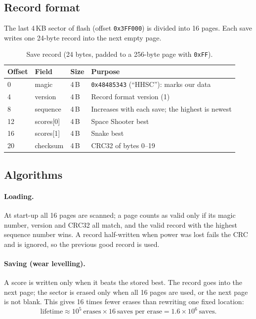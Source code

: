 \documentclass[11pt,a4paper]{article}
\begin{document}
\subsection{Record format}
The last 4\,KB sector of flash (offset \texttt{0x3FF000}) is divided into 16
pages. Each save writes one 24-byte record into the next empty page.

\begin{table}[H]
\centering
\caption{Save record (24 bytes, padded to a 256-byte page with \texttt{0xFF}).}
\begin{tabular}{llll}
\toprule
\textbf{Offset} & \textbf{Field} & \textbf{Size} & \textbf{Purpose} \\
\midrule
0 & magic & 4\,B & \texttt{0x48485343} (``HHSC''): marks our data \\
4 & version & 4\,B & Record format version (1) \\
8 & sequence & 4\,B & Increases with each save; the highest is newest \\
12 & scores[0] & 4\,B & Space Shooter best \\
16 & scores[1] & 4\,B & Snake best \\
20 & checksum & 4\,B & CRC32 of bytes 0--19 \\
\bottomrule
\end{tabular}
\end{table}

\subsection{Algorithms}
\paragraph{Loading.} At start-up all 16 pages are scanned; a page counts as
valid only if its magic number, version and CRC32 all match, and the valid
record with the highest sequence number wins. A record half-written when power
was lost fails the CRC and is ignored, so the previous good record is used.

\paragraph{Saving (wear levelling).} A score is written only when it beats the
stored best. The record goes into the next page; the sector is erased only when
all 16 pages are used, or the next page is not blank. This gives 16 times fewer
erases than rewriting one fixed location:
\[
  \text{lifetime} \approx 10^5\ \text{erases} \times 16\ \text{saves per erase}
  = 1.6\times10^{6}\ \text{saves}.
\]
\end{document}
